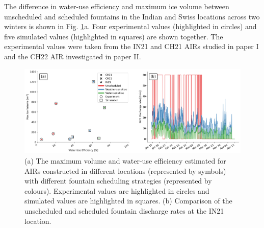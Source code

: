 
The difference in water-use efficiency and maximum ice volume between unscheduled and scheduled fountains in the
Indian and Swiss locations across two winters is shown in Fig. \ref{fig:wue}a. Four experimental values
(highlighted in circles) and five simulated values (highlighted in squares) are shown together.  The
experimental values were taken from the IN21 and CH21 AIRs studied in paper I and the CH22 AIR investigated in
paper II. 

\begin{figure}[htb]
\includegraphics[width=\textwidth]{figs/wue.png}

\caption{(a) The maximum volume and water-use efficiency estimated for AIRs constructed in different locations
(represented by symbols) with different fountain scheduling strategies (represented by colours). Experimental
values are highlighted in circles and simulated values are highlighted in squares. (b) Comparison of
the unscheduled and scheduled fountain discharge rates at the IN21 location.}

\label{fig:wue}
\end{figure}

